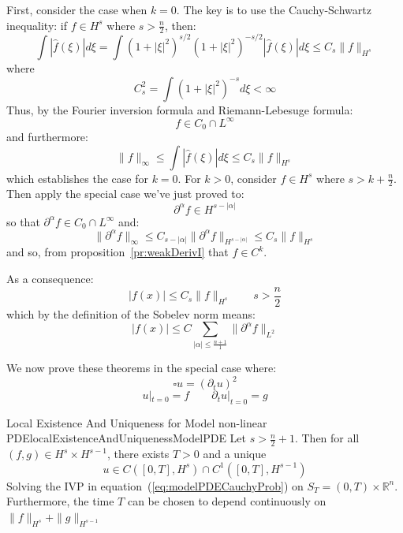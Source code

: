 \documentclass{book}
\newenvironment{Proof}[1][]
  {\begin{ProofTcb}[#1]}
  {\end{ProofTcb}}
\newcommand{\R}{{\mathbb{R}}}
\begin{document}
\begin{Proof}
	First, consider the case when $k = 0$. The key is to use the Cauchy-Schwartz inequality: if $f \in H^s$ where $s > \frac{n}{2}$, then:
	\[
		\int |\hat{f}(\xi)|d\xi = \int (1 + |\xi|^2)^{s/2}(1 + |\xi|^2)^{-s/2} |\hat{f}(\xi)|d\xi \le C_s \|f\|_{H^s}
	\]
	where
	\[
		C_s^2 = \int (1 + |\xi|^2)^{-s}d\xi < \infty
	\]
	Thus, by the Fourier inversion formula and Riemann-Lebesuge formula:
	\[
		f \in C_0\cap L^\infty
	\]
	and furthermore:
	\[
		\|f\|_\infty \le \int |\hat{f}(\xi)|d\xi \le C_s\|f\|_{H^s}
	\]
	which establishes the case for $k = 0$. For $k >0$, consider $f \in H^s$ where $s > k + \frac{n}{2}$. Then apply the
	special case we've just proved to:
	\[
		\partial^\alpha f\in H^{s - |\alpha|}
	\]
	so that $  \partial^\alpha f \in C_0\cap L^\infty$ and:
	\[
		\|  \partial^\alpha f\|_\infty  \le C_{s - |\alpha|}\|  \partial^\alpha f\|_{H^{s- |\alpha|}} \le C_s \|f\|_{H^s}
	\]
	and so, from proposition~\ref{pr:weakDerivI} that $f \in C^k$.
\end{Proof}

As a consequence:
\[
	|f(x)| \le C_s\|f\|_{H^s} \qquad s > \frac{n}{2}
\]
which by the definition of the Sobelev norm means:
\[
	|f(x)| \le C \sum_{|\alpha| \le \frac{n+1}{1}} \|  \partial^\alpha f\|_{L^2}
\]

We now prove these theorems in the special case where:
\begin{equation}\label{eq:modelPDECauchyProb}
  \square u =  (\partial_t u)^2
\end{equation}
\[
	u|_{t=0} = f \qquad  \partial_t u|_{t= 0} = g
\]
\begin{thm}{Local Existence And Uniqueness for Model non-linear PDE}{localExistenceAndUniquenessModelPDE}
	Let $s > \frac{n}{2} +1$. Then for all $(f,g) \in H^s\times H^{s-1}$, there exists $T> 0$ and a unique
	\[
		u \in C([0,T], H^s)\cap C^1([0,T], H^{s-1})
	\]
	Solving the IVP in equation~(\ref{eq:modelPDECauchyProb}) on $S_T = (0,T)\times \R^n$. Furthermore, the time $T$ can
	be chosen to depend continuously on $\|f\|_{H^s} + \|g\|_{H^{s-1}}$
\end{thm}
\end{document}

